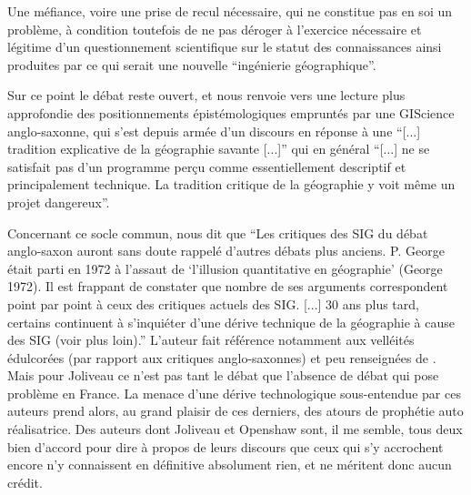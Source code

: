 Une méfiance, voire une prise de recul nécessaire, qui ne constitue pas en soi un problème, à condition toutefois de ne pas déroger à l'exercice nécessaire et légitime d'un questionnement scientifique sur le statut des connaissances ainsi produites par ce qui serait une nouvelle \enquote{ingénierie géographique}.

Sur ce point le débat reste ouvert, et \textcite[474-477]{Joliveau2004} nous renvoie vers une lecture plus approfondie des positionnements épistémologiques empruntés par une GIScience anglo-saxonne, qui s'est depuis armée d'un discours en réponse à une \enquote{[...] tradition explicative de la géographie savante [...]} qui en général \enquote{[...] ne se satisfait pas d'un programme perçu comme essentiellement descriptif et principalement technique. La tradition critique de la géographie y voit même un projet dangereux}.

Concernant ce socle commun, \textcite[477]{Joliveau2004} nous dit que \enquote{Les critiques des SIG du débat anglo-saxon auront sans doute rappelé d'autres débats plus anciens. P. George était parti en 1972 à l'assaut de \enquote{l'illusion quantitative en géographie} (George 1972). Il est frappant de constater que nombre de ses arguments correspondent point par point à ceux des critiques actuels des SIG. [...] 30 ans plus tard, certains continuent à s'inquiéter d'une dérive technique de la géographie à cause des SIG (voir plus loin).} L'auteur fait référence notamment aux velléités édulcorées (par rapport aux critiques anglo-saxonnes) et peu renseignées de \autocite{Staszak2001}. Mais pour Joliveau ce n'est pas tant le débat que l'absence de débat qui pose problème en France. La menace d'une dérive technologique sous-entendue par ces auteurs prend alors, au grand plaisir de ces derniers, des atours de prophétie auto réalisatrice. Des auteurs dont Joliveau et Openshaw sont, il me semble, tous deux bien d'accord pour dire à propos de leurs discours que ceux qui s'y accrochent encore n'y connaissent en définitive absolument rien, et ne méritent donc aucun crédit.


